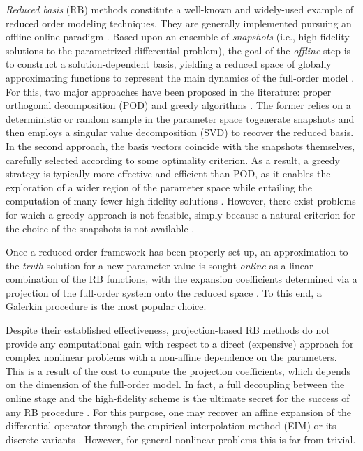 \documentclass[longtitle]{elsarticle}
\numberwithin{equation}{section}
\theoremstyle{theorem}
\theoremstyle{definition}
\theoremstyle{remark}
\theoremstyle{proposition}
\numberwithin{figure}{section}
\begin{document}
		\emph{Reduced basis} (RB) methods constitute a well-known and widely-used example of reduced order modeling techniques. They are generally implemented pursuing an offline-online paradigm \cite{Mad06}. Based upon an ensemble of \emph{snapshots} (i.e., high-fidelity solutions to the parametrized differential problem), the goal of the \emph{offline} step is to construct a solution-dependent basis, yielding a reduced space of globally approximating functions to represent the main dynamics of the full-order model \cite{Bal14, Chen17}. For this, two major approaches have been proposed in the literature: proper orthogonal decomposition (POD) \cite{Lia02, Vol08} and greedy algorithms \cite{HSZ14}. The former relies on a deterministic or random sample in the parameter space to{\linebreak\clearpage\noindent}generate snapshots and then employs a singular value decomposition (SVD) to recover the reduced basis. In the second approach, the basis vectors coincide with the snapshots themselves, carefully selected according to some optimality criterion. As a result, a greedy strategy is typically more effective and efficient than POD, as it enables the exploration of a wider region of the parameter space while entailing the computation of many fewer high-fidelity solutions \cite{HSR16}. However, there exist problems for which a greedy approach is not feasible, simply because a natural criterion for the choice of the snapshots is not available \cite{Bal14}.
		
		Once a reduced order framework has been properly set up, an approximation to the \emph{truth} solution for a new parameter value is sought \emph{online} as a linear combination of the RB functions, with the expansion coefficients determined via a projection of the full-order system onto the reduced space \cite{Buf12}. To this end, a Galerkin procedure is the most popular choice. 
		
		Despite their established effectiveness, projection-based RB methods do not provide any computational gain with respect to a direct (expensive) approach for complex nonlinear problems with a non-affine dependence on the parameters. This is a result of the cost to compute the projection coefficients, which depends on the dimension of the full-order model. In fact, a full decoupling between the online stage and the high-fidelity scheme is the ultimate secret for the success of any RB procedure \cite{QMN15}. For this purpose, one may recover an affine expansion of the differential operator through the empirical interpolation method (EIM) \cite{Bar04} or its discrete variants \cite{Cha10, NMA15}. However, for general nonlinear problems this is far from trivial. 
		
\end{document}
